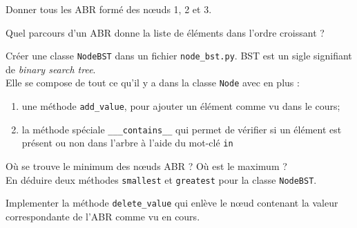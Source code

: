 \documentclass[a4paper,12pt,french]{article}
\begin{document}

\begin{exercice}
Donner tous les ABR formé des n\oe uds 1, 2 et 3.
\end{exercice}


\begin{exercice}
Quel parcours d'un ABR donne la liste de éléments dans l'ordre croissant ?
\end{exercice}

\begin{exercice}
Créer une classe \texttt{NodeBST} dans un fichier \texttt{node_bst.py}. BST est un sigle signifiant de \textit{binary search tree}.\\
Elle se compose de tout ce qu'il y a dans la classe \texttt{Node} avec en plus :
\begin{enumerate}[--]
	\item une méthode \texttt{add_value}, pour ajouter un élément comme vu dans le cours;
    \item la méthode spéciale \texttt{___contains__} qui permet de vérifier si un élément est présent ou non dans l'arbre à l'aide du mot-clé \texttt{in}
\end{enumerate}
\end{exercice}

\begin{exercice}
Où se trouve le minimum des n\oe uds ABR ? Où est le maximum ?\\
En déduire deux méthodes \texttt{smallest} et \texttt{greatest} pour la classe \texttt{NodeBST}.
\end{exercice}

\begin{exercice} 
Implementer la méthode \texttt{delete_value} qui enlève le n\oe ud contenant la valeur correspondante de l'ABR comme vu en cours.
\end{exercice}
\end{document}
